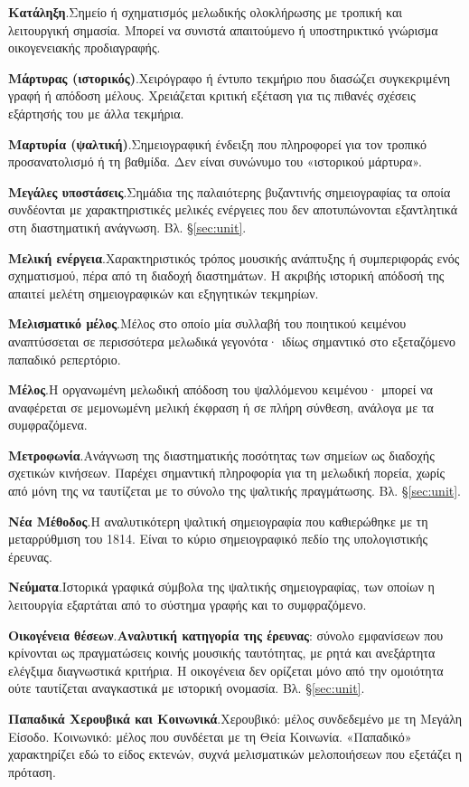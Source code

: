 \documentclass[a4paper]{article}
\newcommand{\glossterm}[3]{\par\noindent\hypertarget{gl:#1}{\textbf{#2}.}\enspace #3\par}
\begin{document}
\glossterm{cadence}{Κατάληξη}{Σημείο ή σχηματισμός μελωδικής ολοκλήρωσης με τροπική και λειτουργική σημασία. Μπορεί να συνιστά απαιτούμενο ή υποστηρικτικό γνώρισμα οικογενειακής προδιαγραφής.}
\glossterm{witness}{Μάρτυρας (ιστορικός)}{Χειρόγραφο ή έντυπο τεκμήριο που διασώζει συγκεκριμένη γραφή ή απόδοση μέλους. Χρειάζεται κριτική εξέταση για τις πιθανές σχέσεις εξάρτησής του με άλλα τεκμήρια.}
\glossterm{martyria}{Μαρτυρία (ψαλτική)}{Σημειογραφική ένδειξη που πληροφορεί για τον τροπικό προσανατολισμό ή τη βαθμίδα. Δεν είναι συνώνυμο του «ιστορικού μάρτυρα».}
\glossterm{great-signs}{Μεγάλες υποστάσεις}{Σημάδια της παλαιότερης βυζαντινής σημειογραφίας τα οποία συνδέονται με χαρακτηριστικές μελικές ενέργειες που δεν αποτυπώνονται εξαντλητικά στη διαστηματική ανάγνωση. Βλ. §\ref{sec:unit}.}
\glossterm{melic-energy}{Μελική ενέργεια}{Χαρακτηριστικός τρόπος μουσικής ανάπτυξης ή συμπεριφοράς ενός σχηματισμού, πέρα από τη διαδοχή διαστημάτων. Η ακριβής ιστορική απόδοσή της απαιτεί μελέτη σημειογραφικών και εξηγητικών τεκμηρίων.}
\glossterm{melismatic}{Μελισματικό μέλος}{Μέλος στο οποίο μία συλλαβή του ποιητικού κειμένου αναπτύσσεται σε περισσότερα μελωδικά γεγονότα· ιδίως σημαντικό στο εξεταζόμενο παπαδικό ρεπερτόριο.}
\glossterm{chant}{Μέλος}{Η οργανωμένη μελωδική απόδοση του ψαλλόμενου κειμένου· μπορεί να αναφέρεται σε μεμονωμένη μελική έκφραση ή σε πλήρη σύνθεση, ανάλογα με τα συμφραζόμενα.}
\glossterm{metrophonia}{Μετροφωνία}{Ανάγνωση της διαστηματικής ποσότητας των σημείων ως διαδοχής σχετικών κινήσεων. Παρέχει σημαντική πληροφορία για τη μελωδική πορεία, χωρίς από μόνη της να ταυτίζεται με το σύνολο της ψαλτικής πραγμάτωσης. Βλ. §\ref{sec:unit}.}
\glossterm{new-method}{Νέα Μέθοδος}{Η αναλυτικότερη ψαλτική σημειογραφία που καθιερώθηκε με τη μεταρρύθμιση του 1814. Είναι το κύριο σημειογραφικό πεδίο της υπολογιστικής έρευνας.}
\glossterm{neumes}{Νεύματα}{Ιστορικά γραφικά σύμβολα της ψαλτικής σημειογραφίας, των οποίων η λειτουργία εξαρτάται από το σύστημα γραφής και το συμφραζόμενο.}
\glossterm{family}{Οικογένεια θέσεων}{\textbf{Αναλυτική κατηγορία της έρευνας}: σύνολο εμφανίσεων που κρίνονται ως πραγματώσεις κοινής μουσικής ταυτότητας, με ρητά και ανεξάρτητα ελέγξιμα διαγνωστικά κριτήρια. Η οικογένεια δεν ορίζεται μόνο από την ομοιότητα ούτε ταυτίζεται αναγκαστικά με ιστορική ονομασία. Βλ. §\ref{sec:unit}.}
\glossterm{repertory}{Παπαδικά Χερουβικά και Κοινωνικά}{Χερουβικό: μέλος συνδεδεμένο με τη Μεγάλη Είσοδο. Κοινωνικό: μέλος που συνδέεται με τη Θεία Κοινωνία. «Παπαδικό» χαρακτηρίζει εδώ το είδος εκτενών, συχνά μελισματικών μελοποιήσεων που εξετάζει η πρόταση.}
\end{document}

